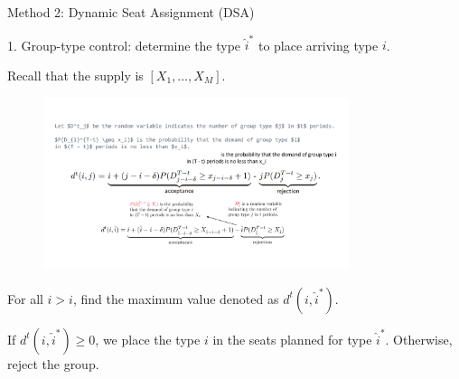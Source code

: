     \begin{frame}{Method 2: Dynamic Seat Assignment (DSA)}
      

      1. {\color{red} Group-type control}: determine the type $\hat{i}^{*}$ to place arriving type $i$. 
      
      \vspace{0.2cm}

      Recall that the supply is $[X_1, \ldots, X_M]$. 

      \vspace{-0.1cm}
  
      \begin{figure}[h]
        \centering
        \includegraphics[width = 0.8\textwidth]{./images/group_type.pdf}
      \end{figure}
  
      \vspace{-0.1cm}
  
      For all $\hat{i} > i$, find the maximum value denoted as $d^{t}(i, \hat{i}^{*})$.
      \vspace{0.1cm}

      If $d^{t}(i, \hat{i}^{*}) \geq 0$, we place the type $i$ in the seats planned for type $\hat{i}^{*}$. Otherwise, reject the group.
    \end{frame}

